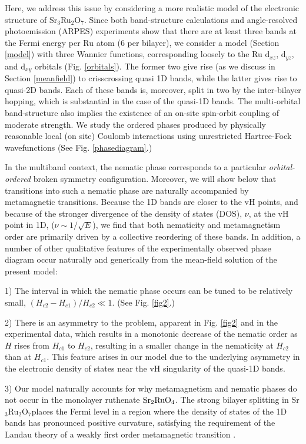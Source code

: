 \documentclass[prb,aps,amssymb,showpacs,twocolumn,amsmath,floatfix]{revtex4}
\def\SRO{Sr$_3$Ru$_2$O$_7$}
\begin{document}
Here, we address this issue by   
considering a more realistic model of the 
electronic structure of \SRO.  Since both band-structure calculations and angle-resolved photoemission
 (ARPES) experiments show that there are at least three bands at the Fermi energy per Ru atom (6 per bilayer),  we consider a model (Section \ref{model}) with three Wannier functions, corresponding loosely to the  Ru d$_{xz}$, d$_{yz}$, and d$_{xy}$ orbitals (Fig. \ref{orbitals}).  The former two give rise (as we discuss in Section 
  \ref{meanfield}) to crisscrossing quasi 1D bands, while the latter gives rise to quasi-2D bands.  
  Each of these bands is, moreover, split in two by the inter-bilayer hopping, which is substantial 
  in the case of the quasi-1D bands.  
  The multi-orbital band-structure also implies the existence of an on-site spin-orbit coupling of moderate strength.  We study the ordered phases produced by physically reasonable local (on site) Coulomb interactions using unrestricted Hartree-Fock wavefunctions (See Fig. \ref{phasediagram}.)  
  
In the multiband context,  the nematic phase corresponds to a particular {\it orbital-ordered}
   broken symmetry configuration.  
  Moreover, we will show below that transitions into such a 
  nematic phase are naturally accompanied by metamagnetic transitions.  
  Because the 1D bands are closer to the vH points, and because of the stronger divergence of the
  density of states (DOS), $\nu$,  at the vH point in 1D, ($\nu \sim 1/\sqrt{E}$), we find that both 
  nematicity and metamagnetism order are primarily driven by a collective reordering of these bands.  
 In addition, a number of other qualitative features of the experimentally observed phase diagram occur naturally and generically from the mean-field solution of the present model:
   
 1)  The interval in which the nematic phase occurs can be tuned to be relatively small, $(H_{c2} - H_{c1})/H_{c2} \ll 1$.
 (See Fig. \ref{fig2}.)
 
2)  There is 
an asymmetry to the problem, apparent   in Fig. \ref{fig2} and in the experimental data, which results in a monotonic decrease of the nematic order as $H$ rises from $H_{c1}$ to 
   $H_{c2}$, resulting in a smaller change in the nematicity at $H_{c2}$ than at $H_{c1}$.  This 
  feature arises in our model due to the underlying asymmetry in the electronic density of states near the vH singularity of the quasi-1D bands.  
   
 3) Our model naturally accounts for why metamagnetism and nematic phases do not occur in the monolayer ruthenate 
 ${\rm Sr}_2{\rm Ru O}_4$.    The strong bilayer splitting in \SRO places the Fermi level 
 in a region where the density of states of the 1D bands has pronounced positive curvature, satisfying 
 the requirement of the Landau theory of a weakly first order metamagnetic transition \cite{Wohlfarth1962}.  
   
\end{document}
